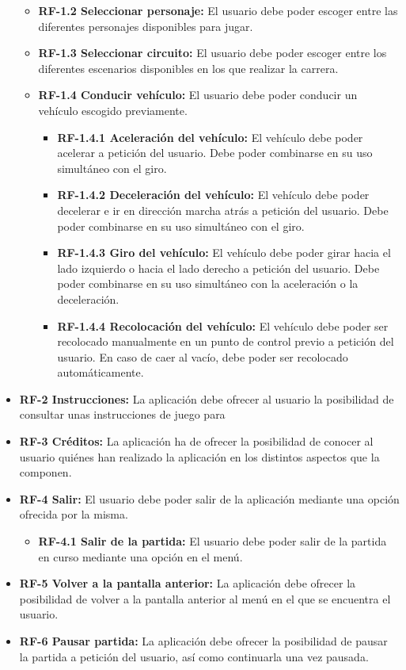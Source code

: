 \begin{itemize}
\begin{itemize}
\begin{itemize}
    	\end{itemize}
    	\item
    		\textbf{RF-1.2 Seleccionar personaje:} El usuario debe poder escoger entre las diferentes personajes disponibles para jugar.
		\item    	
    		\textbf{RF-1.3 Seleccionar circuito:} El usuario debe poder escoger entre los diferentes escenarios disponibles en los que realizar la carrera.
    	\item
    		\textbf{RF-1.4 Conducir vehículo:} El usuario debe poder conducir un vehículo escogido previamente.
    		\begin{itemize}
			\tightlist
				\item \textbf{RF-1.4.1 Aceleración del vehículo:} El vehículo debe poder acelerar a petición del usuario. Debe poder combinarse en su uso simultáneo con el giro.
				\item \textbf{RF-1.4.2 Deceleración del vehículo:} El vehículo debe poder decelerar e ir en dirección marcha atrás a petición del usuario. Debe poder combinarse en su uso simultáneo con el giro.
				\item \textbf{RF-1.4.3 Giro del vehículo:} El vehículo debe poder girar hacia el lado izquierdo o hacia el lado derecho a petición del usuario. Debe poder combinarse en su uso simultáneo con la aceleración o la deceleración.
				\item \textbf{RF-1.4.4 Recolocación del vehículo:} El vehículo debe poder ser recolocado manualmente en un punto de control previo a petición del usuario. En caso de caer al vacío, debe poder ser recolocado automáticamente.
			\end{itemize}
    \end{itemize}
    
	\item \textbf{RF-2 Instrucciones:} La aplicación debe ofrecer al usuario la posibilidad de consultar unas instrucciones de juego para 
	\item \textbf{RF-3 Créditos:} La aplicación ha de ofrecer la posibilidad de conocer al usuario quiénes han realizado la aplicación en los distintos aspectos que la componen.
	\item \textbf{RF-4 Salir:} El usuario debe poder salir de la aplicación mediante una opción ofrecida por la misma.
	\begin{itemize}
	\tightlist
		\item \textbf{RF-4.1 Salir de la partida:} El usuario debe poder salir de la partida en curso mediante una opción en el menú.
	\end{itemize}
	\item \textbf{RF-5 Volver a la pantalla anterior:} La aplicación debe ofrecer la posibilidad de volver a la pantalla anterior al menú en el que se encuentra el usuario.
	\item \textbf{RF-6 Pausar partida:} La aplicación debe ofrecer la posibilidad de pausar la partida a petición del usuario, así como continuarla una vez pausada.
\end{itemize}

